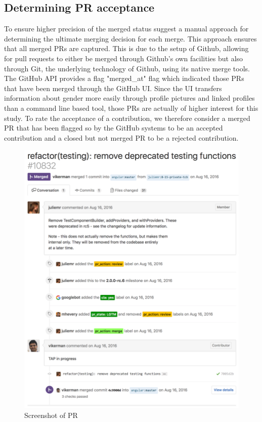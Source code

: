 \subsection{Determining \ac{PR} acceptance}

To ensure higher precision of the merged status \citeauthor{Gousios:2014:ESP:2568225.2568260} suggest a manual approach for determining the ultimate merging decision for each merge. This approach ensures that all merged \ac{PR}s are captured. This is due to the setup of Github, allowing for pull requests to either be merged through Github's own facilities but also through Git, the underlying technology of Github, using its native merge tools. The GitHub \ac{API} provides a flag "merged\_at" flag which indicated those \ac{PR}s that have been merged through the GitHub UI. Since the UI transfers information about gender more easily through profile pictures and linked profiles than a command line based tool, those \ac{PR}s are actually of higher interest for this study.
To rate the acceptance of a contribution, we therefore consider a merged \ac{PR} that has been flagged so by the GitHub systems to be an accepted contribution and a closed but not merged \ac{PR} to be a rejected contribution.

\begin{figure}
\centering
\includegraphics[width=1\columnwidth]{graphics/PRexample.png}
\caption{Screenshot of \ac{PR}}
\label{figure:prexample}
\end{figure}


